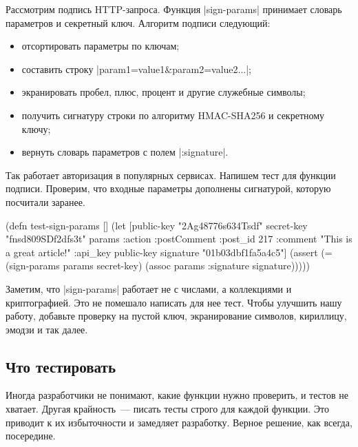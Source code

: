 Рассмотрим подпись HTTP-запроса. Функция \spverb|sign-params| принимает словарь
параметров и секретный ключ. Алгоритм подписи следующий:

\begin{itemize}

\item
  отсортировать параметры по ключам;

\item
  составить строку \spverb|param1=value1&param2=value2...|;

\item
  экранировать пробел, плюс, процент и другие служебные символы;

\item
  получить сигнатуру строки по алгоритму HMAC-SHA256 и секретному ключу;

\item
  вернуть словарь параметров с полем \spverb|:signature|.

\end{itemize}

Так работает авторизация в популярных сервисах. Напишем тест для функции
подписи. Проверим, что входные параметры дополнены сигнатурой, которую посчитали
заранее.

\begin{english}
  \begin{clojure}
(defn test-sign-params []
  (let [public-key "2Ag48776s634Tsdf"
        secret-key "fnsd809SDf2dfs3t"
        params {:action :postComment
                :post_id 217
                :comment "This is a great article!"
                :api_key public-key}
        signature "01b03dbf1fa5a4c5"]
    (assert (= (sign-params params secret-key)
               (assoc params :signature signature)))))
  \end{clojure}
\end{english}

Заметим, что \spverb|sign-params| работает не с числами, а коллекциями и
криптографией. Это не помешало написать для нее тест. Чтобы улучшить нашу
работу, добавьте проверку на пустой ключ, экранирование символов, кириллицу,
эмодзи и так далее.

\subsection{Что тестировать}

Иногда разработчики не понимают, какие функции нужно проверить, и тестов не
хватает. Другая крайность~--- писать тесты строго для каждой функции. Это
приводит к их избыточности и замедляет разработку. Верное решение, как всегда,
посередине.

